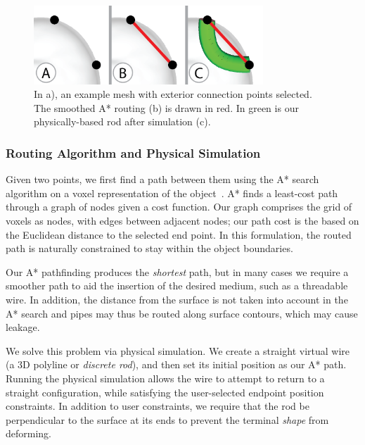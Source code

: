 \begin{figure}[h!]
\centering
    \includegraphics[width=3.4in]{figures/exterior.png}
\caption{In a), an example mesh with exterior connection points selected.  The smoothed A* routing (b) is drawn in {\color{red}red}.  In {\color{tovi}green} is our physically-based rod after simulation (c).}
\label{fig:tool-process-exterior}
\end{figure}

\subsubsection{Routing Algorithm and Physical Simulation}
Given two points, we first find a path between them using the A* search algorithm on a voxel representation of the object~\cite{Hart-Astar}. A* finds a least-cost path through a graph of nodes given a cost function. Our graph comprises the grid of voxels as nodes, with edges between adjacent nodes; our path cost is the based on the Euclidean distance to the selected end point. In this formulation, the routed path is naturally constrained to stay within the object boundaries.

Our A* pathfinding produces the \emph{shortest} path, but in many cases
we require a smoother path to aid the insertion of the desired medium, such as a threadable wire.
In addition, the distance from the surface is not taken into account in the A* search and pipes may thus be routed along surface contours, which may cause leakage.

We solve this problem via physical simulation. We create a straight virtual 
wire (a 3D polyline or \emph{discrete rod}), and then set its initial position 
as our A* path.
Running the physical simulation allows the wire to attempt to return to
a straight configuration, while satisfying the user-selected endpoint position constraints.  In addition to user constraints, we require that the rod be perpendicular to the surface at its ends to prevent the terminal \emph{shape} from deforming.

